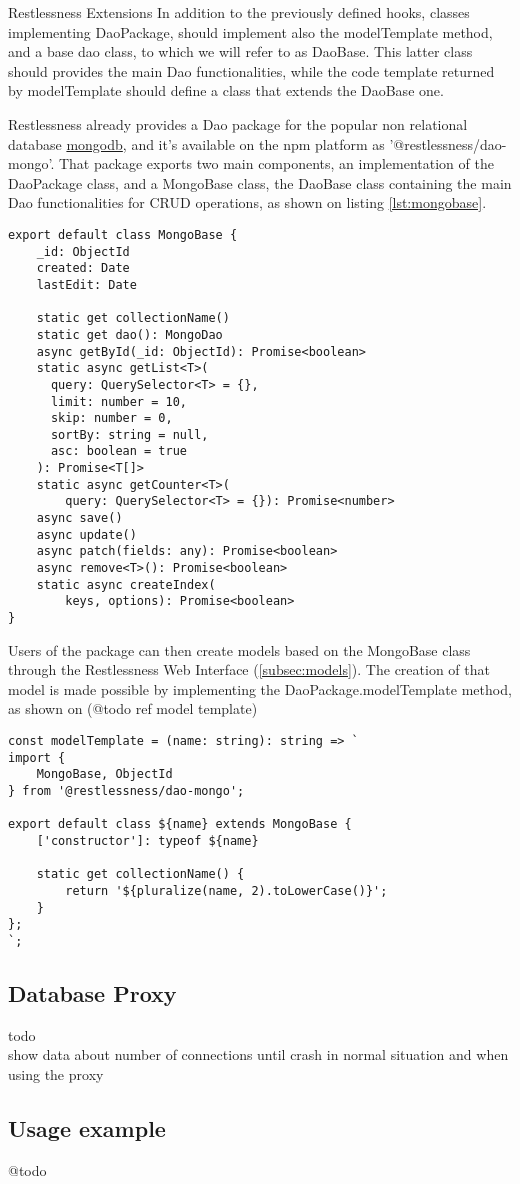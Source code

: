 \begin{chapter}{Restlessness Extensions}
    In addition to the previously defined hooks, classes implementing DaoPackage,
    should implement also the modelTemplate method, and a base dao class, to which
    we will refer to as DaoBase. This latter class should provides the main Dao
    functionalities, while the code template returned by modelTemplate should define
    a class that extends the DaoBase one.

    Restlessness already provides a Dao package for the popular non relational
    database \href{https://www.mongodb.com/}{mongodb}, and it's available on the
    npm platform as '@restlessness/dao-mongo'.
    That package exports two main components, an implementation of the DaoPackage
    class, and a MongoBase class, the DaoBase class containing the main Dao
    functionalities for CRUD operations, as shown on listing \ref{lst:mongobase}.

    \begin{lstlisting}[caption=MongoBase class definition, label={lst:mongobase}]
export default class MongoBase {
    _id: ObjectId
    created: Date
    lastEdit: Date

    static get collectionName()
    static get dao(): MongoDao
    async getById(_id: ObjectId): Promise<boolean>
    static async getList<T>(
      query: QuerySelector<T> = {},
      limit: number = 10,
      skip: number = 0,
      sortBy: string = null,
      asc: boolean = true
    ): Promise<T[]>
    static async getCounter<T>(
        query: QuerySelector<T> = {}): Promise<number>
    async save()
    async update()
    async patch(fields: any): Promise<boolean>
    async remove<T>(): Promise<boolean>
    static async createIndex(
        keys, options): Promise<boolean>
}
    \end{lstlisting}

    Users of the package can then create models based on the MongoBase class through
    the Restlessness Web Interface (\ref{subsec:models}).
    The creation of that model is made possible by implementing the DaoPackage.modelTemplate
    method, as shown on (@todo ref model template)

    \begin{lstlisting}
const modelTemplate = (name: string): string => `
import {
    MongoBase, ObjectId
} from '@restlessness/dao-mongo';

export default class ${name} extends MongoBase {
    ['constructor']: typeof ${name}

    static get collectionName() {
        return '${pluralize(name, 2).toLowerCase()}';
    }
};
`;
    \end{lstlisting}

    \subsection{Database Proxy}
    todo\\
    show data about number of connections until crash in normal
    situation and when using the proxy

    \subsection{Usage example}
    @todo

\end{chapter}